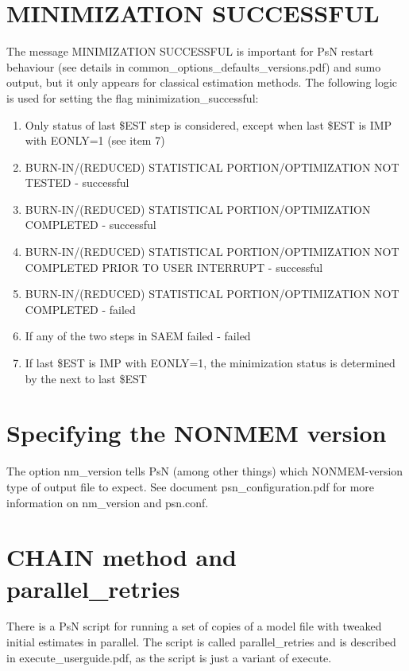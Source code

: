 \section{MINIMIZATION SUCCESSFUL}

The message MINIMIZATION SUCCESSFUL is important for PsN restart behaviour (see details in common\_options\_defaults\_versions.pdf) and sumo output, but it only appears for classical estimation methods. The following logic is used for setting the flag minimization\_successful:

\begin{enumerate}
\item Only status of last \$EST step is considered, except when last \$EST is IMP with EONLY=1 (see item 7)
\item BURN-IN/(REDUCED) STATISTICAL PORTION/OPTIMIZATION NOT TESTED - successful
\item BURN-IN/(REDUCED) STATISTICAL PORTION/OPTIMIZATION COMPLETED - successful
\item BURN-IN/(REDUCED) STATISTICAL PORTION/OPTIMIZATION NOT COMPLETED PRIOR TO USER INTERRUPT - successful
\item BURN-IN/(REDUCED) STATISTICAL PORTION/OPTIMIZATION NOT COMPLETED - failed
\item If any of the two steps in SAEM failed - failed 
\item If last \$EST is IMP with EONLY=1, the minimization status is determined by the next to last \$EST
\end{enumerate}

\section{Specifying the NONMEM version}

The option nm\_version tells PsN (among other things) which NONMEM-version type of output file to expect. See document psn\_configuration.pdf for more information on nm\_version and psn.conf.

\section{CHAIN method and parallel\_retries}

There is a PsN script for running a set of copies of a model file with tweaked initial estimates in parallel. The script is called parallel\_retries and is described in execute\_userguide.pdf, as the script is just a variant of execute.

